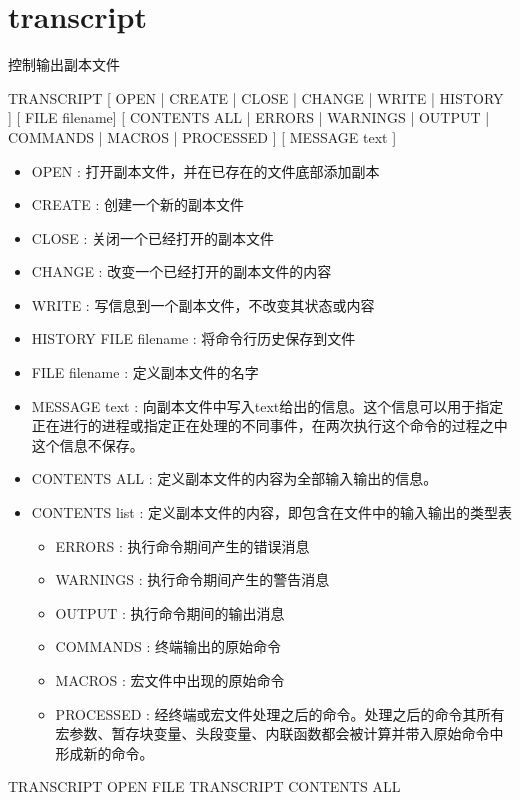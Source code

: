 \section{transcript}
\label{cmd:transcript}

控制输出副本文件

TRANSCRIPT [ OPEN | CREATE | CLOSE | CHANGE | WRITE | HISTORY ] [ FILE filename]  [ CONTENTS ALL | ERRORS | WARNINGS | OUTPUT | COMMANDS | MACROS | PROCESSED ] [ MESSAGE text ]

\begin{itemize}
\item OPEN : 打开副本文件，并在已存在的文件底部添加副本 
\item CREATE : 创建一个新的副本文件 
\item CLOSE : 关闭一个已经打开的副本文件 
\item CHANGE : 改变一个已经打开的副本文件的内容 
\item WRITE : 写信息到一个副本文件，不改变其状态或内容 
\item HISTORY FILE filename : 将命令行历史保存到文件 
\item FILE filename : 定义副本文件的名字 
\item MESSAGE text : 向副本文件中写入text给出的信息。这个信息可以用于指定正在进行的进程或指定正在处理的不同事件，在两次执行这个命令的过程之中这个信息不保存。 
\item CONTENTS ALL : 定义副本文件的内容为全部输入输出的信息。 
\item CONTENTS list : 定义副本文件的内容，即包含在文件中的输入输出的类型表
	\begin{itemize}
	\item ERRORS : 执行命令期间产生的错误消息
	\item WARNINGS : 执行命令期间产生的警告消息
	\item OUTPUT : 执行命令期间的输出消息 
	\item COMMANDS : 终端输出的原始命令 
	\item MACROS : 宏文件中出现的原始命令 
	\item PROCESSED : 经终端或宏文件处理之后的命令。处理之后的命令其所有宏参数、暂存块变量、头段变量、内联函数都会被计算并带入原始命令中形成新的命令。\\
	\end{itemize}
\end{itemize}

TRANSCRIPT OPEN FILE TRANSCRIPT CONTENTS ALL

